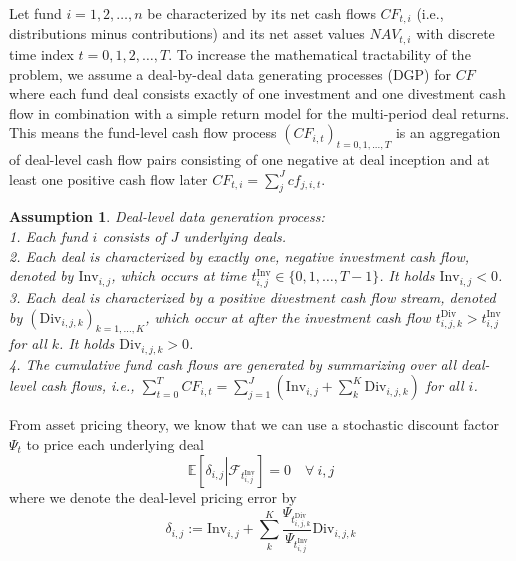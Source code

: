 \documentclass[12pt]{article}
\newtheorem{assume}{Assumption}
\begin{document}
Let fund $i=1,2,\dots,n$ be characterized by its net cash flows ${CF}_{t,i}$ (i.e., distributions minus contributions) and its net asset values ${NAV}_{t,i}$ with discrete time index $t=0,1,2,\dots,T$.
To increase the mathematical tractability of the problem, we assume a  deal-by-deal data generating processes (DGP) for $CF$ where each fund deal consists exactly of one investment and one divestment cash flow in combination with a simple return model for the multi-period deal returns.
This means the fund-level cash flow process $(CF_{i,t})_{t=0,1,...,T}$ is an aggregation of deal-level cash flow pairs consisting of one negative at deal inception and at least one positive cash flow later $CF_{t,i} = \sum_j^J {cf}_{j,i,t}$.
\begin{assume}
	\label{ass:deal_level_dgp}
	Deal-level data generation process: \\
	1. Each fund $i$ consists of $J$ underlying deals. \\
	2. Each deal is characterized by exactly one, negative investment cash flow, denoted by $\mathrm{Inv}_{i,j}$, which occurs at time $t_{i,j}^{\mathrm{Inv}} \in \{ 0,1,\dots, T-1 \}$. 
	It holds $\mathrm{Inv}_{i,j} < 0$. \\
	3. Each deal is characterized by a positive divestment cash flow stream, denoted by $(\mathrm{Div}_{i,j,k})_{k=1,\dots,K}$, which occur at after the investment cash flow $t_{i,j,k}^{\mathrm{Div}} > t_{i,j}^{\mathrm{Inv}}$ for all $k$.
	It holds $\mathrm{Div}_{i,j,k} > 0$. \\
	4. The cumulative fund cash flows are generated by summarizing over all deal-level cash flows, i.e., 
	$\sum_{t=0}^T {CF}_{i,t} = \sum_{j=1}^J \left( \mathrm{Inv}_{i,j} + \sum_k^K \mathrm{Div}_{i,j,k} \right)$ for all $i$.
\end{assume}

From asset pricing theory, we know that we can use a stochastic discount factor $\Psi_t$ to price each underlying deal
\begin{equation}
	\label{eq:deal_pricing}
	\mathbb{E} \left[ 
	\delta_{i,j}
	\left| \mathcal{F}_{t_{i,j}^{\mathrm{Inv}}} \right.
	\right] = 0
	\quad \forall \ i,j
\end{equation}
where we denote the deal-level pricing error by
\begin{equation}
	\delta_{i,j} :=
	\label{eq:deal_pricing_error}
	\mathrm{Inv}_{i,j} +
	\sum_k^K
	\frac{\Psi_{t_{i,j,k}^{\mathrm{Div}}}}{\Psi_{t_{i,j}^{\mathrm{Inv}}}}
	\mathrm{Div}_{i,j,k}
\end{equation}
\end{document}
